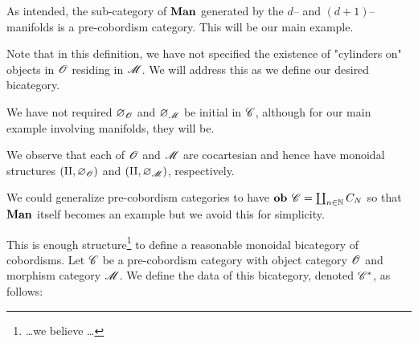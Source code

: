 \documentclass[./Thick_TQFTs_and_Quantum_Information.tex]{subfiles}
\begin{document}
\begin{exm}
As intended, the sub-category of $\textbf{Man}$ generated by the $d$-- and
$(d + 1)$--manifolds is a pre-cobordism category. This will be our main example.
\end{exm}

\begin{rmk}
Note that in this definition, we have not specified the existence of "cylinders
on" objects in $\mathscr{O}$ residing in $\mathscr{M}$. We will address this
as we define our desired bicategory.
\end{rmk}

\begin{rmk}
We have not required $\varnothing_{\mathscr{O}}$ and $\varnothing_{\mathscr{M}}$ be initial
in $\mathscr{C}$, although for our main example involving manifolds, they will be.
\end{rmk}

\begin{rmk}
We observe that each of $\mathscr{O}$ and $\mathscr{M}$ are cocartesian and hence have
monoidal structures $(\amalg, \varnothing_{\mathscr{O}})$ and
$(\amalg, \varnothing_{\mathscr{M}})$, respectively.
\end{rmk}

\begin{rmk}
We could generalize pre-cobordism categories to have
$\textbf{ob } \mathscr{C} = \coprod_{n \in \mathbb{N}} C_N$ so that $\textbf{Man}$ itself becomes an example
but we avoid this for simplicity.
\end{rmk}

This is enough structure\footnote{\dots we believe \dots} to define a reasonable
monoidal bicategory of cobordisms. Let $\mathscr{C}$ be a pre-cobordism category with
object category $\mathscr{O}$ and morphism category $\mathscr{M}$. We define the data
of this bicategory, denoted $\mathscr{C}^*$, as follows:
\end{document}
